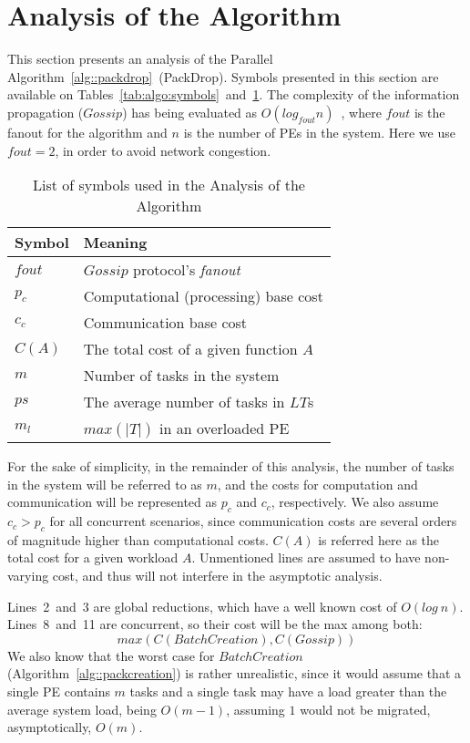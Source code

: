 \section{Analysis of the Algorithm} \label{sec:analysis}

This section presents an analysis of the Parallel Algorithm~\ref{alg::packdrop}~(PackDrop). 
Symbols presented in this section are available on Tables~\ref{tab:algo:symbols}~and~\ref{tab:analysis:symbols}.
The complexity of the information propagation ($Gossip$) has being evaluated as $O(log_{fout}n)$~\cite{grapevine},
where $fout$ is the fanout for the algorithm and $n$ is the number of PEs in the system.
Here we use $fout=2$, in order to avoid network congestion. 

\begin{table}[!ht]
	\caption{List of symbols used in the Analysis of the Algorithm}
	\centering	
	\begin{tabular}{l |l}
		Symbol			& Meaning\\		\hline
		$fout$			& $Gossip$ protocol's \textit{fanout}						 \\ 
		$p_c$			& Computational (processing) base cost				 \\
		$c_c$			& Communication base cost							 \\
		$C(A)$			& The total cost of a given function $A$				 \\
		$m$				& Number of tasks in the system						 \\
		$ps$				& The average number of tasks in $LT$s				 \\
		$m_l$			& $max(|T|)$ in an overloaded PE						 \\
	\end{tabular}
	\label{tab:analysis:symbols}
\end{table}

For the sake of simplicity, in the remainder of this analysis, the number of tasks in the system
will be referred to as $m$, and the costs for computation and communication will be represented as $p_c$ and $c_c$, respectively.
We also assume $c_c > p_c$ for all concurrent scenarios, since communication costs are several orders of magnitude higher than computational costs.
$C(A)$ is referred here as the total cost for a given workload $A$.
Unmentioned lines are assumed to have non-varying cost, and thus will not interfere in the asymptotic analysis.

Lines~2~and~3 are global reductions, which have a well known cost of $O(log\ n)$.
Lines~8~and~11 are concurrent, so their cost will be the max among both:
\begin{equation}
  max(C(BatchCreation),C(Gossip))
\end{equation}
We also know that the worst case for $BatchCreation$ (Algorithm~\ref{alg::packcreation}) is rather unrealistic, 
since it would assume that a single PE contains $m$ tasks and a single task may have a load greater than the average system load, being $O(m-1)$, assuming $1$ would not be migrated, asymptotically, $O(m)$.


